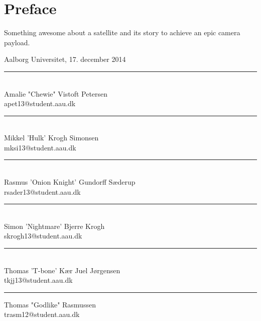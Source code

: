 \chapter*{Preface}\label{ch:forord}
Something awesome about a satellite and its story to achieve an epic camera payload.

\vspace{0.5\baselineskip}\hfill Aalborg Universitet, 17. december 2014

\vfill

\begin{minipage}[b]{0.45\textwidth}
 \centering
 \rule{\textwidth}{0.5pt}\\
  Amalie "Chewie" Vistoft Petersen\\
 {\footnotesize apet13@student.aau.dk}
\end{minipage}
\vspace{2\baselineskip}
\hfill
\begin{minipage}[b]{0.45\textwidth}
 \centering
 \rule{\textwidth}{0.5pt}\\
  Mikkel 'Hulk' Krogh Simonsen\\
 {\footnotesize mksi13@student.aau.dk}
\end{minipage}
\vspace{1.5\baselineskip}
\hfill
\begin{minipage}[b]{0.45\textwidth}
 \centering
 \rule{\textwidth}{0.5pt}\\
  Rasmus 'Onion Knight' Gundorff Sæderup\\
 {\footnotesize rsader13@student.aau.dk}
\end{minipage}
\vspace{2\baselineskip}
\hfill
\begin{minipage}[b]{0.45\textwidth}
 \centering
 \rule{\textwidth}{0.5pt}\\
  Simon 'Nightmare' Bjerre Krogh\\
 {\footnotesize skrogh13@student.aau.dk}
\end{minipage}
\vspace{2\baselineskip}
\hfill
\begin{minipage}[b]{0.45\textwidth}
 \centering
 \rule{\textwidth}{0.5pt}\\
  Thomas 'T-bone' Kær Juel Jørgensen\\
 {\footnotesize tkjj13@student.aau.dk}
\end{minipage}
\vspace{2\baselineskip}
\hfill
\begin{minipage}[b]{0.45\textwidth}
 \centering
 \rule{\textwidth}{0.5pt}
  Thomas "Godlike" Rasmussen\\
 {\footnotesize trasm12@student.aau.dk}
\end{minipage}